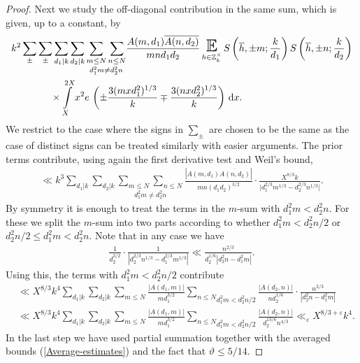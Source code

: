 \documentclass[a4paper,10pt,twoside]{amsart}
\theoremstyle{definition}
\numberwithin{equation}{section}
\newcommand\E{\mathbb{E}}
\newcommand\eps{\varepsilon}
\renewcommand\:{\colon}
\begin{document}
\begin{proof}
Next we study the off-diagonal contribution in the same sum, which is given, up to a constant, by 
\begin{align*}
&k^2\sum_\pm\sum_\pm\sum_{d_1|k}\sum_{d_2|k}\underset{d_1^2m\neq d_2^2n}{\sum_{m\leq N}\sum_{n\leq N}}\frac{A(m,d_1)\overline{A(n,d_2)}}{mnd_1d_2}\mathop{\text{\LARGE$\E$}}_{h\in\mathbb Z_k^\times}S\left(\overline h,\pm m;\frac k{d_1}\right)S\left(\overline h,\pm n;\frac k{d_2}\right)\\
&\qquad\qquad\times\int\limits_X^{2X}x^2e\,\left(\pm\frac{3(mxd_1^2)^{1/3}}k\mp\frac{3(nxd_2^2)^{1/3}}k\right)\,\mathrm d x. 
\end{align*}
We restrict to the case where the signs in $\sum_\pm$ are chosen to be the same as the case of distinct signs can be treated similarly with easier arguments. The prior terms contribute, using again the first derivative test and Weil's bound, 
\begin{align*}
\ll k^3\sum_{d_1|k}\sum_{d_2|k}\underset{d_1^2m\neq d_2^2n}{\sum_{m\leq N}\sum_{n\leq N}}\frac{|A(m,d_1)\overline{A(n,d_2)}|}{mn(d_1d_2)^{3/2}}\cdot\frac{X^{8/3}k}{\bigl|d_1^{2/3}m^{1/3}-d_2^{2/3}n^{1/3}\bigr|}.
\end{align*}      
By symmetry it is enough to treat the terms in the $m$-sum with $d_1^2m<d_2^2n$. For these we split the $m$-sum into two parts according to whether $d_1^2m<d_2^2n/2$ or $d_2^2n/2\leq d_1^2m<d_2^2n$. Note that in any case we have
\begin{align}\label{estimate-y} 
\frac1{d_2^{3/2}}\cdot\frac1{|d_2^{2/3}n^{1/3}-d_1^{2/3}m^{1/3}|}\ll\frac{n^{2/3}}{d_2^{1/6}|d_2^2n-d_1^2m|}.
\end{align}
Using this, the terms with $d_1^2m<d_2^2n/2$ contribute
\begin{align*}
&\ll X^{8/3}k^{4}\sum_{d_1|k}\sum_{d_2|k}\sum_{m\leq N}\frac{|A(d_1,m)|}{md_1^{3/2}}\underset{d_1^2m< d_2^2n/2}{\sum_{n\leqslant N}}\frac{|A(d_2,n)|}{nd_2^{1/6}}\cdot\frac{n^{2/3}}{|d_2^2n-d_1^2m|}\\
&\ll X^{8/3}k^{4}\sum_{d_1|k}\sum_{d_2|k}\sum_{m\leq N}\frac{|A(d_1,m)|}{md_1^{3/2}}\underset{d_1^2m< d_2^2n/2}{\sum_{n\leqslant N}}\frac{|A(d_2,n)|}{d_2^{13/6}n^{4/3}}
\ll_\eps X^{8/3+\varepsilon}k^{4}.
\end{align*}
In the last step we have used partial summation together with the averaged bounds (\ref{Average-estimates}) and the fact that $\vartheta\leq 5/14$.


\end{proof}
\end{document}
